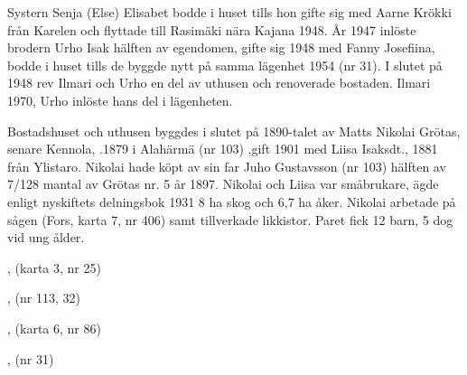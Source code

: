Systern Senja (Else) Elisabet bodde i huset tills hon gifte sig med Aarne Krökki från Karelen och flyttade till Rasimäki nära Kajana 1948. År 1947 inlöste brodern Urho Isak hälften av egendomen, gifte sig 1948 med Fanny Josefiina, bodde i  huset tills de byggde nytt på samma lägenhet 1954 (nr 31). I slutet på 1948 rev Ilmari och Urho en del av uthusen och  renoverade bostaden.
Ilmari  1970, Urho inlöste hans del i lägenheten.


Bostadshuset och uthusen byggdes i slutet på 1890-talet av Matts Nikolai Grötas, senare Kennola, .1879 i Alahärmä (nr 103) ,gift 1901 med Liisa Isaksdt.,  1881 från Ylistaro. Nikolai hade köpt av sin far Juho Gustavsson (nr 103) hälften av 7/128 mantal av Grötas nr. 5 år 1897. Nikolai och Liisa var småbrukare, ägde enligt nyskiftets delningsbok 1931 8 ha skog och 6,7 ha åker. Nikolai arbetade på sågen (Fors, karta 7, nr 406) samt tillverkade likkistor. Paret fick 12 barn, 5 dog vid ung ålder.
\begin{jhchildren}
  \item {}
  \item {}
  \item {}
  \item {}
  \item {}, (karta 3, nr 25)
  \item {}, (nr 113, 32)
  \item {}
  \item {}, (karta 6, nr 86)
  \item {}
  \item {}
  \item {}, (nr 31)
  \item {}
\end{jhchildren}

